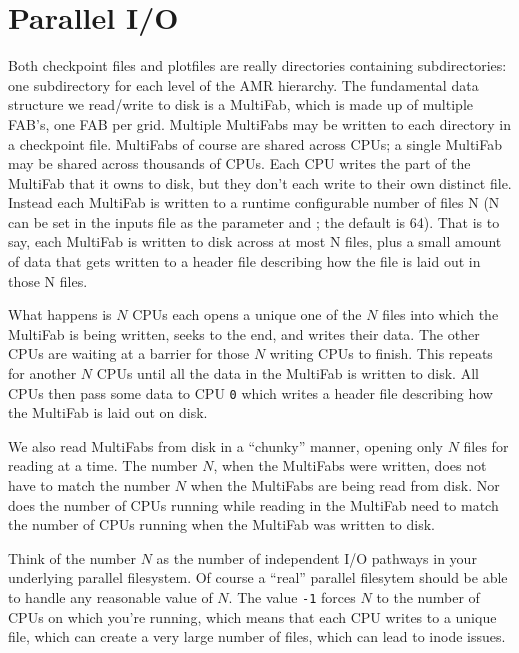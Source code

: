 \section{Parallel I/O}

Both checkpoint files and plotfiles are really directories containing
subdirectories: one subdirectory for each level of the AMR hierarchy.
The fundamental data structure we read/write to disk is a MultiFab,
which is made up of multiple FAB's, one FAB per grid.  Multiple
MultiFabs may be written to each directory in a checkpoint file.
MultiFabs of course are shared across CPUs; a single MultiFab may be
shared across thousands of CPUs.  Each CPU writes the part of the
MultiFab that it owns to disk, but they don't each write to their own
distinct file.  Instead each MultiFab is written to a runtime
configurable number of files N (N can be set in the inputs file as the
parameter  and ; the
default is 64).  That is to say, each MultiFab is written to disk
across at most N files, plus a small amount of data that gets written
to a header file describing how the file is laid out in those N files.

What happens is $N$ CPUs each opens a unique one of the $N$ files into
which the MultiFab is being written, seeks to the end, and writes
their data.  The other CPUs are waiting at a barrier for those $N$
writing CPUs to finish.  This repeats for another $N$ CPUs until all the
data in the MultiFab is written to disk.  All CPUs then pass some data
to CPU {\tt 0} which writes a header file describing how the MultiFab is
laid out on disk.

We also read MultiFabs from disk in a ``chunky'' manner, opening only $N$
files for reading at a time.  The number $N$, when the MultiFabs were
written, does not have to match the number $N$ when the MultiFabs are
being read from disk.  Nor does the number of CPUs running while
reading in the MultiFab need to match the number of CPUs running when
the MultiFab was written to disk.

Think of the number $N$ as the number of independent I/O pathways in
your underlying parallel filesystem.  Of course a ``real'' parallel
filesytem should be able to handle any reasonable value of $N$.  The
value {\tt -1} forces $N$ to the number of CPUs on which you're
running, which means that each CPU writes to a unique file, which can
create a very large number of files, which can lead to inode issues.
